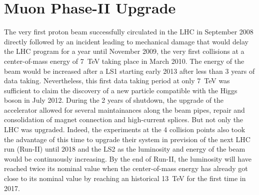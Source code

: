 \renewcommand\evenpagerightmark{{\scshape\small Chapter 3}}
\renewcommand\oddpageleftmark{{\scshape\small Muon Phase-II Upgrade}}

\renewcommand{\bibname}{References}

\hyphenation{}

\chapter[Muon Phase-II Upgrade]%
{Muon Phase-II Upgrade}
\label{chapt:3}
		
	The very first proton beam successfully circulated in the LHC in September 2008 directly followed by an incident leading to mechanical damage that would delay the LHC program for a year until November 2009, the very first collisions at a center-of-mass energy of \SI{7}{TeV} taking place in March 2010. The energy of the beam would be increased after a \acf{LS1} starting early 2013 after less than 3 years of data taking. Nevertheless, this first data taking period at only \SI{7}{TeV} was sufficient to claim the discovery of a new particle compatible with the Higgs boson in July 2012. During the 2 years of shutdown, the upgrade of the accelerator allowed for several maintainances along the beam pipes, repair and consolidation of magnet connection and high-current splices. But not only the LHC was upgraded. Indeed, the experiments at the 4 collision points also took the advantage of this time to upgrade their system in prevision of the next LHC run (Run-II) until 2018 and the \acf{LS2} as the luminosity and energy of the beam would be continuously increasing. By the end of Run-II, the luminosity will have reached twice its nominal value when the center-of-mass energy has already got close to its nominal value by reaching an historical \SI{13}{TeV} for the first time in 2017.
	
